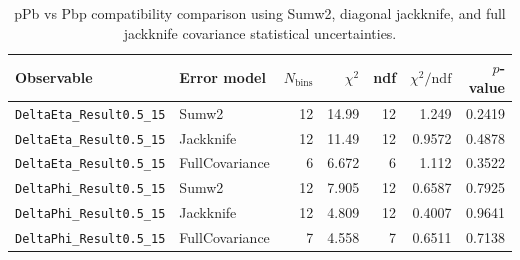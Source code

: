 \begin{table}[htbp]
\centering
\begin{tabular}{|l|l|r|r|r|r|r|}
\hline
Observable & Error model & $N_{\mathrm{bins}}$ & $\chi^2$ & ndf & $\chi^2/\mathrm{ndf}$ & $p$-value \\
\hline
\texttt{DeltaEta_Result0.5_15} & Sumw2 & 12 & 14.99 & 12 & 1.249 & 0.2419 \\
\texttt{DeltaEta_Result0.5_15} & Jackknife & 12 & 11.49 & 12 & 0.9572 & 0.4878 \\
\texttt{DeltaEta_Result0.5_15} & FullCovariance & 6 & 6.672 & 6 & 1.112 & 0.3522 \\
\texttt{DeltaPhi_Result0.5_15} & Sumw2 & 12 & 7.905 & 12 & 0.6587 & 0.7925 \\
\texttt{DeltaPhi_Result0.5_15} & Jackknife & 12 & 4.809 & 12 & 0.4007 & 0.9641 \\
\texttt{DeltaPhi_Result0.5_15} & FullCovariance & 7 & 4.558 & 7 & 0.6511 & 0.7138 \\
\hline
\end{tabular}
\caption{pPb vs Pbp compatibility comparison using Sumw2, diagonal jackknife, and full jackknife covariance statistical uncertainties.}
\label{tab:ppbp-compatibility}
\end{table}
